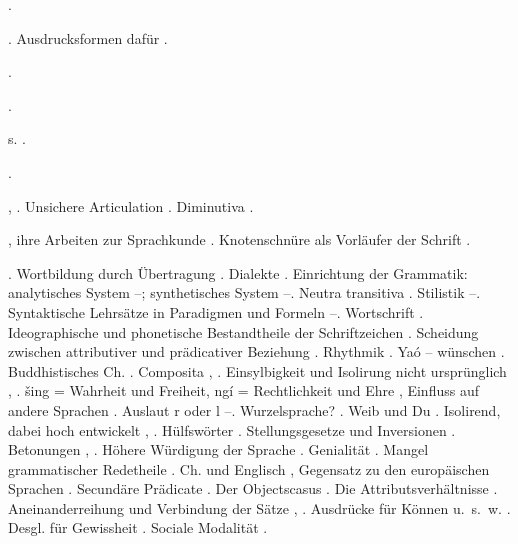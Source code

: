 \begin{register}

 \pageref{sp.54}.

. Ausdrucksformen dafür \pageref{sp.95}.

 \pageref{sp.104}.

 \pageref{sp.102}.


 s. .

 

 \pageref{sp.178}.



, . Unsichere Articulation \pageref{sp.194}. Diminutiva \pageref{sp.379}.

, ihre Arbeiten zur Sprachkunde \pageref{sp.19}. Knotenschnüre als Vorläufer der Schrift \pageref{sp.128}.

. Wortbildung durch Übertragung \pageref{sp.42}. Dialekte \pageref{sp.58}. Einrichtung der Grammatik: analytisches System \pageref{sp.90}–\pageref{sp.92}; synthetisches System \pageref{sp.101}–\pageref{sp.104}.  Neutra transitiva \pageref{sp.102}. Stilistik \pageref{sp.105}–\pageref{sp.106}. Syntaktische Lehrsätze in Paradigmen und Formeln \pageref{sp.114}–\pageref{sp.118}. Wortschrift \pageref{sp.128}. Ideographische und phonetische Bestandtheile der Schriftzeichen \pageref{sp.129}. Scheidung zwischen attributiver und prädicativer Beziehung \pageref{sp.151}.  Rhythmik \pageref{sp.197}. Yaó – wünschen \pageref{sp.222}. Buddhistisches Ch. \pageref{sp.231}. Composita \pageref{sp.242}, \pageref{sp.243}.  Einsylbigkeit und Isolirung nicht ursprünglich \pageref{sp.255}, \pageref{sp.257}. šing = Wahrheit und Freiheit, ngí = Rechtlichkeit und Ehre \pageref{sp.265}, Einfluss auf andere Sprachen \pageref{sp.271}. Auslaut r oder l \pageref{sp.290}–\pageref{sp.291}. Wurzelsprache? \pageref{sp.296}. Weib und Du \pageref{sp.306}.  Isolirend, dabei hoch entwickelt \pageref{sp.346}, \pageref{sp.362}.  Hülfswörter \pageref{sp.347}. Stellungsgesetze und Inversionen \pageref{sp.372}. Betonungen \pageref{sp.377}, \pageref{sp.379}. Höhere Würdigung der Sprache \pageref{sp.389}. Genialität \pageref{sp.399}. Mangel grammatischer Redetheile \pageref{sp.440}. Ch. und Englisch \pageref{sp.440}, Gegensatz zu den europäischen Sprachen \pageref{sp.447}. Secundäre Prädicate \pageref{sp.459}. Der Objectscasus \pageref{sp.461}. Die Attributsverhältnisse \pageref{sp.462}. Aneinanderreihung und Verbindung der Sätze \pageref{sp.465}, \pageref{sp.469}. Ausdrücke für Können u.~s.~w. \pageref{sp.471}. Desgl. für Gewissheit \pageref{sp.471}. Sociale Modalität \pageref{sp.474}.


\end{register}
